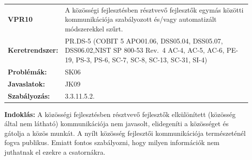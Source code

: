 \documentclass[12pt,magyar,a4paper,oneside]{scrreprt}
\begin{document}
\begin{longtable}[]{@{}ll@{}}
\toprule
\endhead
\begin{minipage}[t]{0.16\columnwidth}\raggedright
\textbf{VPR10}\strut
\end{minipage} & \begin{minipage}[t]{0.79\columnwidth}\raggedright
A közösségi fejlesztésben résztvevő fejlesztők egymás közötti
kommunikációja szabályozott és/vagy automatizált módszerekkel
szűrt.\strut
\end{minipage}\tabularnewline
\begin{minipage}[t]{0.16\columnwidth}\raggedright
\textbf{Keretrendszer:}\strut
\end{minipage} & \begin{minipage}[t]{0.79\columnwidth}\raggedright
PR.DS-5 (COBIT 5 APO01.06, DSS05.04, DSS05.07, DSS06.02,NIST SP 800-53
Rev.~4 AC-4, AC-5, AC-6, PE-19, PS-3, PS-6, SC-7, SC-8, SC-13, SC-31,
SI-4)\strut
\end{minipage}\tabularnewline
\begin{minipage}[t]{0.16\columnwidth}\raggedright
\textbf{Problémák:}\strut
\end{minipage} & \begin{minipage}[t]{0.79\columnwidth}\raggedright
SK06\strut
\end{minipage}\tabularnewline
\begin{minipage}[t]{0.16\columnwidth}\raggedright
\textbf{Javaslatok:}\strut
\end{minipage} & \begin{minipage}[t]{0.79\columnwidth}\raggedright
JK09\strut
\end{minipage}\tabularnewline
\begin{minipage}[t]{0.16\columnwidth}\raggedright
\textbf{Szabályozás:}\strut
\end{minipage} & \begin{minipage}[t]{0.79\columnwidth}\raggedright
3.3.11.5.2.\strut
\end{minipage}\tabularnewline
\bottomrule
\end{longtable}

\textbf{Indoklás: } A közösségi fejlesztésben résztvevő fejlesztők
elkülönített (közösség által nem látható) kommunikációja nem javasolt,
elidegeníti a közösséget és gátolja a közös munkát. A nyílt közösség
fejlesztői kommunikációja természeténél fogva publikus. Emiatt fontos
szabályozni, hogy milyen információk nem juthatnak el ezekre a
csatornákra.
\end{document}

